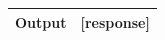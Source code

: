 \documentclass[authoryear,preprint,review,12pt]{elsarticle}
\begin{document}
\begin{table}[htbp]
{\begin{tabular}{ll}
\textbf{Output} & {[}response{]}                                                                                                                                                                                                                                                                                                                                                                                                                                                                                                                                                                                                                                                                                                                                                                                                                                                                                                                                                                                                                                                                                                                                                                                                                                                                                                                                                                                                                                                                               \\ \bottomrule
\end{tabular}}
\end{table}
\end{document}
